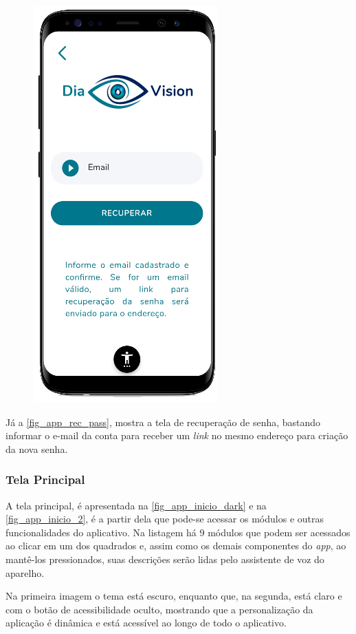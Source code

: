 \begin{figure}[htb]
\begin{minipage}{0.47\textwidth}
        \includegraphics[scale=0.72]{Imagens/desenvolvimento/app/app_rec_pass.png}
    \end{minipage}
\end{figure}

Já a \autoref{fig_app_rec_pass}, mostra a tela de recuperação de senha, bastando informar o e-mail
da conta para receber um \emph{link} no mesmo endereço para criação da nova senha.

\newpage

\subsubsection{Tela Principal}

A tela principal, é apresentada na \autoref{fig_app_inicio_dark} e na \autoref{fig_app_inicio_2},
é a partir dela que pode-se acessar os módulos e outras funcionalidades do aplicativo.
Na listagem há 9 módulos que podem ser acessados ao clicar em um dos quadrados e, assim
como os demais componentes do \emph{app}, ao mantê-los pressionados, suas descrições
serão lidas pelo assistente de voz do aparelho.

Na primeira imagem o tema está escuro, enquanto que, na segunda, está claro e com o
botão de acessibilidade oculto, mostrando que a personalização da aplicação é dinâmica
e está acessível ao longo de todo o aplicativo.

